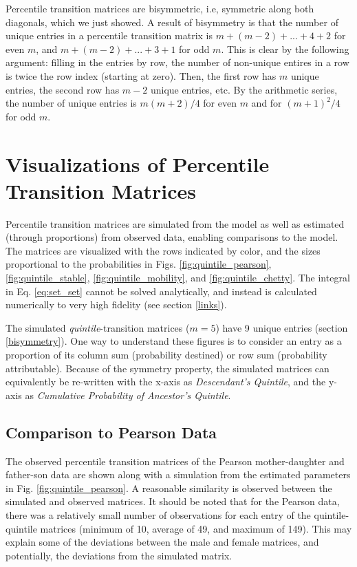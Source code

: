 \documentclass{svproc} %
\begin{document}
Percentile transition matrices are bisymmetric, i.e, symmetric along both diagonals, which we just showed. A result of bisymmetry is that the number of unique entries in a percentile transition matrix is $m + (m-2) + ... + 4 + 2$ for even $m$, and $m + (m-2) + ... + 3 + 1$ for odd $m$. This is clear by the following argument: filling in the entries by row, the number of non-unique entires in a row is twice the row index (starting at zero). Then, the first row has $m$ unique entries, the second row has $m-2$ unique entries, etc. By the arithmetic series, the number of unique entries is $m(m+2)/4$ for even $m$ and for $(m+1)^2/4$ for odd $m$. 



\section{Visualizations of Percentile Transition Matrices} \label{visuals}

Percentile transition matrices are simulated from the model as well as estimated (through proportions) from observed data, enabling comparisons to the model. The matrices are visualized with the rows indicated by color, and the sizes proportional to the probabilities in Figs. \ref{fig:quintile_pearson}, \ref{fig:quintile_stable}, \ref{fig:quintile_mobility}, and \ref{fig:quintile_chetty}. The integral in Eq. \ref{eq:set_set} cannot be solved analytically, and instead is calculated numerically to very high fidelity (see section \ref{links}). 

The simulated \emph{quintile}-transition matrices ($m = 5$) have 9 unique entries (section \ref{bisymmetry}). One way to understand these figures is to consider an entry as a proportion of its column sum (probability destined) or row sum (probability attributable). Because of the symmetry property, the simulated matrices can equivalently be re-written with the x-axis as \emph{Descendant's Quintile}, and the y-axis as \emph{Cumulative Probability of Ancestor's Quintile}. 


\subsection{Comparison to Pearson Data}

The observed percentile transition matrices of the Pearson mother-daughter and father-son data are shown along with a simulation from the estimated parameters in Fig. \ref{fig:quintile_pearson}. A reasonable similarity is observed between the simulated and observed matrices. It should be noted that for the Pearson data, there was a relatively small number of observations for each entry of the quintile-quintile matrices (minimum of 10, average of 49, and maximum of 149). This may explain some of the deviations between the male and female matrices, and potentially, the deviations from the simulated matrix. 
\end{document}
